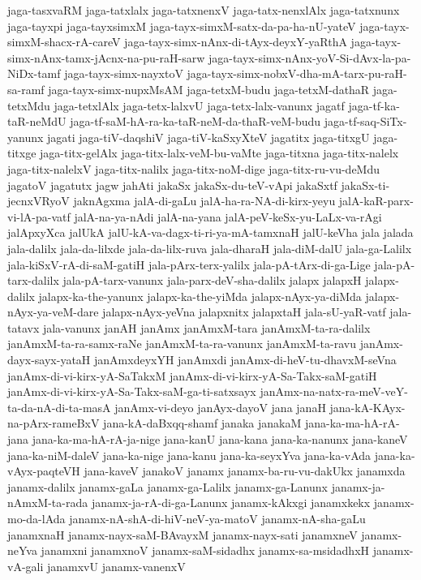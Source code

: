 {jaga-tasxvaRM
jaga-tatxlalx
jaga-tatxnenxV
jaga-tatx-nenxlAlx
jaga-tatxnunx
jaga-tayxpi
jaga-tayxsimxM
jaga-tayx-simxM-satx-da-pa-ha-nU-yateV
jaga-tayx-simxM-shacx-rA-careV
jaga-tayx-simx-nAnx-di-tAyx-deyxY-yaRthA
jaga-tayx-simx-nAnx-tamx-jAcnx-na-pu-raH-sarw
jaga-tayx-simx-nAnx-yoV-Si-dAvx-la-pa-NiDx-tamf
jaga-tayx-simx-nayxtoV
jaga-tayx-simx-nobxV-dha-mA-tarx-pu-raH-sa-ramf
jaga-tayx-simx-nupxMsAM
jaga-tetxM-budu
jaga-tetxM-dathaR
jaga-tetxMdu
jaga-tetxlAlx
jaga-tetx-lalxvU
jaga-tetx-lalx-vanunx
jagatf
jaga-tf-ka-taR-neMdU
jaga-tf-saM-hA-ra-ka-taR-neM-da-thaR-veM-budu
jaga-tf-saq-SiTx-yanunx
jagati
jaga-tiV-daqshiV
jaga-tiV-kaSxyXteV
jagatitx
jaga-titxgU
jaga-titxge
jaga-titx-gelAlx
jaga-titx-lalx-veM-bu-vaMte
jaga-titxna
jaga-titx-nalelx
jaga-titx-nalelxV
jaga-titx-nalilx
jaga-titx-noM-dige
jaga-titx-ru-vu-deMdu
jagatoV
jagatutx
jagw
jahAti
jakaSx
jakaSx-du-teV-vApi
jakaSxtf
jakaSx-ti-jecnxVRyoV
jaknAgxma
jalA-di-gaLu
jalA-ha-ra-NA-di-kirx-yeyu
jalA-kaR-parx-vi-lA-pa-vatf
jalA-na-ya-nAdi
jalA-na-yana
jalA-peV-keSx-yu-LaLx-va-rAgi
jalApxyXca
jalUkA
jalU-kA-va-dagx-ti-ri-ya-mA-tamxnaH
jalU-keVha
jala
jalada
jala-dalilx
jala-da-lilxde
jala-da-lilx-ruva
jala-dharaH
jala-diM-dalU
jala-ga-Lalilx
jala-kiSxV-rA-di-saM-gatiH
jala-pArx-terx-yalilx
jala-pA-tArx-di-ga-Lige
jala-pA-tarx-dalilx
jala-pA-tarx-vanunx
jala-parx-deV-sha-dalilx
jalapx
jalapxH
jalapx-dalilx
jalapx-ka-the-yanunx
jalapx-ka-the-yiMda
jalapx-nAyx-ya-diMda
jalapx-nAyx-ya-veM-dare
jalapx-nAyx-yeVna
jalapxnitx
jalapxtaH
jala-sU-yaR-vatf
jala-tatavx
jala-vanunx
janAH
janAmx
janAmxM-tara
janAmxM-ta-ra-dalilx
janAmxM-ta-ra-samx-raNe
janAmxM-ta-ra-vanunx
janAmxM-ta-ravu
janAmx-dayx-sayx-yataH
janAmxdeyxYH
janAmxdi
janAmx-di-heV-tu-dhavxM-seVna
janAmx-di-vi-kirx-yA-SaTakxM
janAmx-di-vi-kirx-yA-Sa-Takx-saM-gatiH
janAmx-di-vi-kirx-yA-Sa-Takx-saM-ga-ti-satxsayx
janAmx-na-natx-ra-meV-veY-ta-da-nA-di-ta-masA
janAmx-vi-deyo
janAyx-dayoV
jana
janaH
jana-kA-KAyx-na-pArx-rameBxV
jana-kA-daBxqq-shamf
janaka
janakaM
jana-ka-ma-hA-rA-jana
jana-ka-ma-hA-rA-ja-nige
jana-kanU
jana-kana
jana-ka-nanunx
jana-kaneV
jana-ka-niM-daleV
jana-ka-nige
jana-kanu
jana-ka-seyxYva
jana-ka-vAda
jana-ka-vAyx-paqteVH
jana-kaveV
janakoV
janamx
janamx-ba-ru-vu-dakUkx
janamxda
janamx-dalilx
janamx-gaLa
janamx-ga-Lalilx
janamx-ga-Lanunx
janamx-ja-nAmxM-ta-rada
janamx-ja-rA-di-ga-Lanunx
janamx-kAkxgi
janamxkekx
janamx-mo-da-lAda
janamx-nA-shA-di-hiV-neV-ya-matoV
janamx-nA-sha-gaLu
janamxnaH
janamx-nayx-saM-BAvayxM
janamx-nayx-sati
janamxneV
janamx-neYva
janamxni
janamxnoV
janamx-saM-sidadhx
janamx-sa-msidadhxH
janamx-vA-gali
janamxvU
janamx-vanenxV
}
